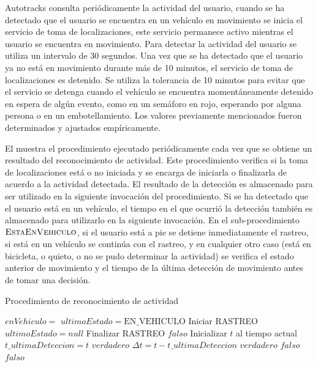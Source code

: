 Autotracks consulta periódicamente la actividad del usuario, cuando se ha detectado que el usuario se encuentra en un vehículo en movimiento se inicia el servicio de toma de localizaciones, este servicio permanece activo mientras el usuario se encuentra en movimiento. Para detectar la actividad del usuario se utiliza un intervalo de 30 segundos. Una vez que se ha detectado que el usuario ya no está en movimiento durante más de 10 minutos, el servicio de toma de localizaciones es detenido. Se utiliza la tolerancia de 10 minutos para evitar que el servicio se detenga cuando el vehículo se encuentra momentáneamente detenido en espera de algún evento, como en un semáforo en rojo, esperando por alguna persona o en un embotellamiento. Los valores previamente mencionados fueron determinados y ajustados empíricamente.

El  muestra el procedimiento ejecutado periódicamente cada vez que se obtiene un resultado del reconocimiento de actividad. Este procedimiento verifica si la toma de localizaciones está o no iniciada y se encarga de iniciarla o finalizarla de acuerdo a la actividad detectada. El resultado de la detección es almacenado para ser utilizado en la siguiente invocación del procedimiento. Si se ha detectado que el usuario está en un vehículo, el tiempo en el que ocurrió la detección también es almacenado para utilizarlo en la siguiente invocación. En el sub-procedimiento $\Call {EstaEnVehiculo}{}$, si el usuario está a pie se detiene inmediatamente el rastreo, si está en un vehículo se continúa con el rastreo, y en cualquier otro caso (está en bicicleta, o quieto, o no se pudo determinar la actividad) se verifica el estado anterior de movimiento y el tiempo de la última detección de movimiento antes de tomar una decisión.
 
\begin{algorithm}
\caption{Procedimiento de reconocimiento de actividad}
\label{alg:deteccion_actividad}
\begin{algorithmic}[1]
	\State $enVehiculo =$ 
		\State $ultimoEstado = \text{EN\_VEHICULO}$
			\State Iniciar RASTREO
		\EndIf
	\Else
		\State $ultimoEstado = null$
			\State Finalizar RASTREO
		\EndIf
	\EndIf
\EndProcedure
\Statex
{}
		\State \Return $falso$
	\Else
		\State Inicializar $t$ al tiempo actual
			\State $t\_ultimaDeteccion = t$ 
			\State \Return $verdadero$
		\Else
			\State $\Delta t = t - t\_ultimaDeteccion$
				\State \Return $verdadero$
			\Else
				\State \Return $falso$
			\EndIf
		\Else
			\State \Return $falso$
		\EndIf
		\EndIf
	\EndIf
\EndFunction
\end{algorithmic}
\end{algorithm}

